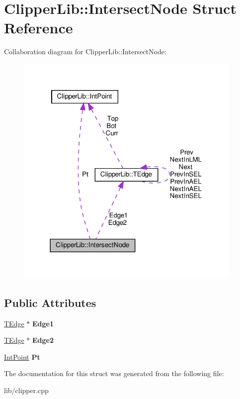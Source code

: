 \hypertarget{struct_clipper_lib_1_1_intersect_node}{}\section{Clipper\+Lib\+:\+:Intersect\+Node Struct Reference}
\label{struct_clipper_lib_1_1_intersect_node}


Collaboration diagram for Clipper\+Lib\+:\+:Intersect\+Node\+:
\nopagebreak
\begin{figure}[H]
\begin{center}
\leavevmode
\includegraphics[width=310pt]{struct_clipper_lib_1_1_intersect_node__coll__graph}
\end{center}
\end{figure}
\subsection*{Public Attributes}
\begin{DoxyCompactItemize}
\item 
\mbox{\label{struct_clipper_lib_1_1_intersect_node_a43fd790cc38441edb594841d79b25f13}} 
\hyperlink{struct_clipper_lib_1_1_t_edge}{T\+Edge} $\ast$ {\bfseries Edge1}
\item 
\mbox{\label{struct_clipper_lib_1_1_intersect_node_afcb56e7564fedf1c90962a9f75454539}} 
\hyperlink{struct_clipper_lib_1_1_t_edge}{T\+Edge} $\ast$ {\bfseries Edge2}
\item 
\mbox{\label{struct_clipper_lib_1_1_intersect_node_a91fc92370fb47797dae0602443e6475e}} 
\hyperlink{struct_clipper_lib_1_1_int_point}{Int\+Point} {\bfseries Pt}
\end{DoxyCompactItemize}


The documentation for this struct was generated from the following file\+:\begin{DoxyCompactItemize}
\item 
lib/clipper.\+cpp\end{DoxyCompactItemize}
